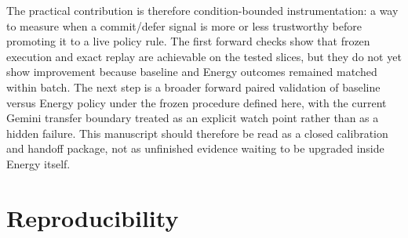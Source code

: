 \documentclass[11pt,a4paper]{article}
\begin{document}
The practical contribution is therefore condition-bounded instrumentation: a way to measure when a commit/defer signal is more or less trustworthy before promoting it to a live policy rule. The first forward checks show that frozen execution and exact replay are achievable on the tested slices, but they do not yet show improvement because baseline and Energy outcomes remained matched within batch. The next step is a broader forward paired validation of baseline versus Energy policy under the frozen procedure defined here, with the current Gemini transfer boundary treated as an explicit watch point rather than as a hidden failure.
This manuscript should therefore be read as a closed calibration and handoff package,
not as unfinished evidence waiting to be upgraded inside Energy itself.

\section{Reproducibility}
\label{sec:repro}
\end{document}
